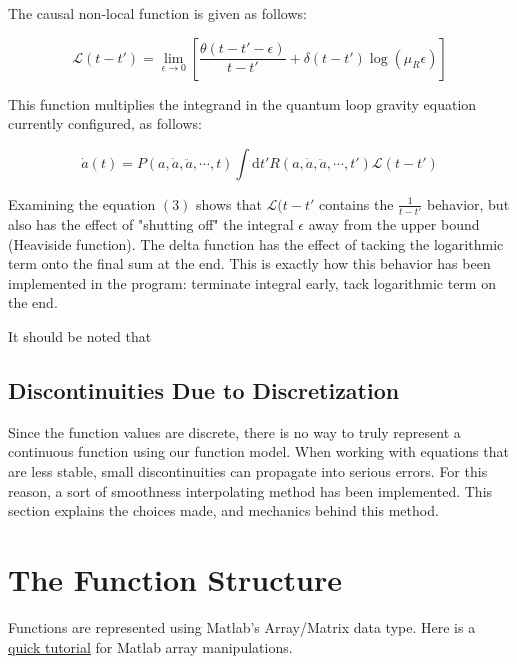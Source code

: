 \documentclass{article}
\def\D{\mathrm{d}} %
\begin{document}
The causal non-local function is given as follows: 

\begin{equation}
\mathcal{L}(t - t') = \lim_{\epsilon \to 0} \left[ \frac{\theta(t - t' - \epsilon)}{t - t'} + \delta (t - t') \log (\mu_R \epsilon) \right]
\end{equation}

This function multiplies the integrand in the quantum loop gravity equation currently configured, as follows: 

\begin{equation}
\dot{a}(t) = P(a, \dot{a}, \ddot{a}, \cdots, t) \int \D t' R(a, \dot{a}, \ddot{a}, \cdots, t') \mathcal{L}(t - t')
\end{equation}

Examining the equation \( (3) \) shows that \( \mathcal{L}(t - t' \) contains the \( \frac{1}{t - t'}  \) behavior, but also has the effect of "shutting off" the integral \( \epsilon \) away from the upper bound (Heaviside function). The delta function has the effect of tacking the logarithmic term onto the final sum at the end. This is exactly how this behavior has been implemented in the program: terminate integral early, tack logarithmic term on the end. 

It should be noted that 



 
 \subsection{Discontinuities Due to Discretization}
 
 Since the function values are discrete, there is no way to truly represent a continuous function using our function model. When working with equations that are less stable, small discontinuities can propagate into serious errors. For this reason, a sort of smoothness interpolating method has been implemented. This section explains the choices made, and mechanics behind this method. 
 
 


\section{The Function Structure}

Functions are represented using Matlab's Array/Matrix data type. Here is a \href{https://www.mathworks.com/help/matlab/learn_matlab/matrices-and-arrays.html}{quick tutorial} for Matlab array manipulations. 
\end{document}
